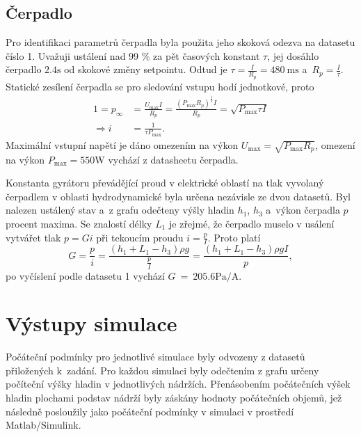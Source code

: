 \documentclass[conference]{IEEEtran}
\begin{document}
\subsection{Čerpadlo}
\label{sec:identifikace_cerpadla}
Pro identifikaci parametrů čerpadla byla použita jeho skoková odezva na datasetu číslo 1.
Uvažuji ustálení nad 99 \% za pět časových konstant $\tau$, jej dosáhlo čerpadlo $2.4 \si{\second}$ od skokové změny setpointu.
Odtud je $\tau = \frac{I}{R_p} = 480~\si{\milli\second}$ a~$R_p =\frac{I}{\tau}$.
Statické zesílení čerpadla se pro sledování vstupu hodí jednotkové, proto
\begin{equation}
    \begin{aligned}
        1 = p_\infty &= \frac{U_\text{max}I}{R_p} = \frac{(P_\text{max} R_p)^{\frac{1}{2}} I}{R_p} 
        = \sqrt{P_\text{max} \tau I} 
        \\ \Rightarrow i~&= \frac{1}{\tau P_\text{max}}.        
    \end{aligned}
\end{equation}
Maximální vstupní napětí je dáno omezením na výkon $U_\text{max} = \sqrt{P_\text{max} R_p}$,
omezení na výkon $P_\text{max} = 550 \si{\watt}$ vychází z datasheetu čerpadla.

Konstanta gyrátoru převádějící proud v elektrické oblastí na tlak vyvolaný čerpadlem v oblasti hydrodynamické byla určena nezávisle ze dvou datasetů.
Byl nalezen ustálený stav a~z grafu odečteny výšly hladin $h_1$, $h_3$ a~výkon čerpadla $p$ procent maxima. Se znalostí délky $L_1$
je zřejmé, že čerpadlo muselo v usálení vytvářet tlak $p = Gi$ při tekoucím proudu $i = \frac{p}{I}$. Proto platí 
\begin{equation}
    G = \frac{p}{i} = \frac{(h_1 + L_1 - h_3) \rho g}{\frac{p}{I}} = \frac{(h_1 + L_1 - h_3) \rho g I}{p},
\end{equation}
po vyčíslení podle datasetu 1 vychází $G~=~205.6 \si{\pascal\per\ampere}$.



\section{Výstupy simulace}

Počáteční podmínky pro jednotlivé simulace byly odvozeny z datasetů přiložených k~zadání.
Pro každou simulaci byly odečtením z grafu určeny počíteční výšky hladin v jednotlivých
nádržích. Přenásobením počátečních výšek hladin plochami podstav nádrží byly záskány hodnoty počátečních objemů,
jež následně posloužily jako počáteční podmínky v simulaci v prostředí Matlab/Simulink.
\end{document}
